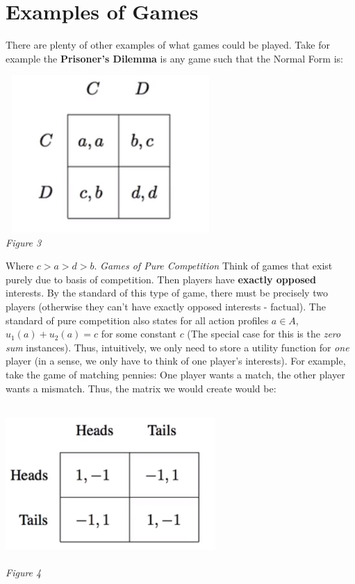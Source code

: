 \documentclass{article}
\begin{document}
\section{Examples of Games}

There are plenty of other examples of what games could be played. Take for example the \textbf{Prisoner's Dilemma} is any game such that the Normal Form is:
\begin{center}
    \includegraphics[width = 8cm, height = 6cm]{IMG_003.png} \\
    \emph{Figure 3}
\end{center}
Where \(c > a > d > b\).
\vskip 0.1in
\emph{Games of Pure Competition}
\vskip 0.1in
Think of games that exist purely due to basis of competition. Then players have \textbf{exactly opposed} interests. By the standard of this type of game, there must be precisely two players (otherwise they can't have exactly opposed interests - factual). The standard of pure competition also states for all action profiles \(a \in A\), \(u_{1}(a) + u_{2}(a) = c\) for some constant \(c\) (The special case for this is the \emph{zero sum} instances). Thus, intuitively, we only need to store a utility function for \emph{one} player (in a sense, we only have to think of one player's interests). For example, take the game of matching pennies: One player wants a match, the other player wants a mismatch. Thus, the matrix we would create would be: 
\begin{center}
    \includegraphics[width = 8cm, height = 6cm]{IMG_004.png} \\
    \emph{Figure 4}
\end{center}
\end{document}
